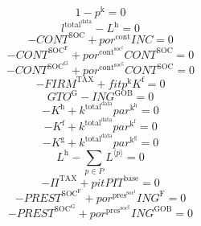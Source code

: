 \begin{equation}
1 - p^{\mathrm{k}} = 0
\end{equation}
\begin{equation}
l^{\mathrm{total}^{\mathrm{data}}} - L^{\mathrm{h}} = 0
\end{equation}
\begin{equation}
-{C\!O\!N\!T}^{\mathrm{SOC}} + {{p\!o\!r}^{\mathrm{cont}}} {{I\!N\!C}} = 0
\end{equation}
\begin{equation}
-{C\!O\!N\!T}^{\mathrm{SOC}^{\mathrm{F}}} + {{p\!o\!r}^{\mathrm{cont}^{\mathrm{soc}^{\mathrm{f}}}}} {{C\!O\!N\!T}^{\mathrm{SOC}}} = 0
\end{equation}
\begin{equation}
-{C\!O\!N\!T}^{\mathrm{SOC}^{\mathrm{G}}} + {{p\!o\!r}^{\mathrm{cont}^{\mathrm{soc}^{\mathrm{g}}}}} {{C\!O\!N\!T}^{\mathrm{SOC}}} = 0
\end{equation}
\begin{equation}
-{F\!I\!R\!M}^{\mathrm{TAX}} + {{f\!i\!t}} {p^{\mathrm{k}}} {K^{\mathrm{f}}} = 0
\end{equation}
\begin{equation}
{G\!T\!O}^{\mathrm{G}} - {I\!N\!G}^{\mathrm{GOB}} = 0
\end{equation}
\begin{equation}
-K^{\mathrm{h}} + {k^{\mathrm{total}^{\mathrm{data}}}} {{p\!a\!r}^{\mathrm{k}^{\mathrm{h}}}} = 0
\end{equation}
\begin{equation}
-K^{\mathrm{f}} + {k^{\mathrm{total}^{\mathrm{data}}}} {{p\!a\!r}^{\mathrm{k}^{\mathrm{f}}}} = 0
\end{equation}
\begin{equation}
-K^{\mathrm{g}} + {k^{\mathrm{total}^{\mathrm{data}}}} {{p\!a\!r}^{\mathrm{k}^{\mathrm{g}}}} = 0
\end{equation}
\begin{equation}
L^{\mathrm{h}} - \sum_{p\in P} {L}^{\langle p\rangle} = 0
\end{equation}
\begin{equation}
-\Pi^{\mathrm{TAX}} + {{p\!i\!t}} {{P\!I\!T}^{\mathrm{base}}} = 0
\end{equation}
\begin{equation}
-{P\!R\!E\!S\!T}^{\mathrm{SOC}^{\mathrm{F}}} + {{p\!o\!r}^{\mathrm{pres}^{\mathrm{soc}^{\mathrm{f}}}}} {{I\!N\!G}^{\mathrm{F}}} = 0
\end{equation}
\begin{equation}
-{P\!R\!E\!S\!T}^{\mathrm{SOC}^{\mathrm{G}}} + {{p\!o\!r}^{\mathrm{pres}^{\mathrm{soc}^{\mathrm{g}}}}} {{I\!N\!G}^{\mathrm{GOB}}} = 0
\end{equation}
